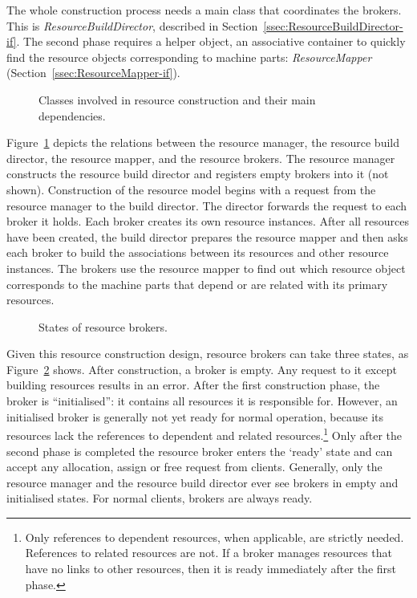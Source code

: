 \documentclass[a4paper,twoside]{tce}
\begin{document}
The whole construction process needs a main class that coordinates the
brokers. This is \emph{ResourceBuildDirector}, described in
Section~\ref{ssec:ResourceBuildDirector-if}.
%
The second phase requires a helper object, an associative container to
quickly find the resource objects corresponding to machine parts:
\emph{ResourceMapper} (Section~\ref{ssec:ResourceMapper-if}).

\begin{figure}[tb]
  \centerline{}
  \caption{Classes involved in resource construction and their main
    dependencies.}
  \label{fig:resource-construction}
\end{figure}
%
Figure~\ref{fig:resource-construction} depicts the relations between the
resource manager, the resource build director, the resource mapper, and the
resource brokers.
%
The resource manager constructs the resource build director and registers
empty brokers into it (not shown). Construction of the resource model begins
with a request from the resource manager to the build director. The director
forwards the request to each broker it holds. Each broker creates its own
resource instances.
%
After all resources have been created, the build director prepares the
resource mapper and then asks each broker to build the associations between
its resources and other resource instances. The brokers use the resource
mapper to find out which resource object corresponds to the machine parts
that depend or are related with its primary resources.

\begin{figure}[tb]
\centerline{}
\caption{States of resource brokers.}
  \label{fig:BrokerStates}
\end{figure}
%
Given this resource construction design, resource brokers can take three
states, as Figure~\ref{fig:BrokerStates} shows. After construction, a
broker is empty. Any request to it except building resources results in an
error. After the first construction phase, the broker is ``initialised'': it
contains all resources it is responsible for. However, an initialised broker
is generally not yet ready for normal operation, because its resources lack
the references to dependent and related resources.\footnote{
%
  Only references to dependent resources, when applicable, are strictly
  needed. References to related resources are not. If a broker manages
  resources that have no links to other resources, then it is ready
  immediately after the first phase.}
%
Only after the second phase is completed the resource broker enters the
`ready' state and can accept any allocation, assign or free request from
clients. Generally, only the resource manager and the resource build
director ever see brokers in empty and initialised states. For normal
clients, brokers are always ready.
\end{document}
